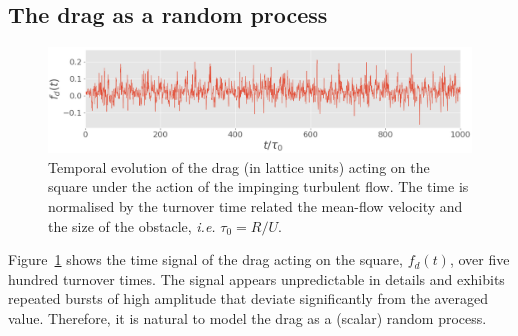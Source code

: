 \documentclass[pre,aps,floatfix,10pt,superscriptaddress, notitlepage,preprint]{revtex4-1}
\begin{document}
\subsection{The drag as a random process
}
\label{sec:pdfs}

\begin{figure}
  \centering
  \includegraphics[width=0.7\linewidth]{typical_drag_signal/typical_drag_signal.png}
  \caption{Temporal evolution of the drag (in lattice units) acting on the square under the action of the impinging turbulent flow. The time is normalised by the turnover time related the mean-flow velocity and the size of the obstacle, \emph{i.e.} $\tau_0=R/U$.}
  \label{fig:typical_drag_signal}
\end{figure}



%
Figure~\ref{fig:typical_drag_signal} shows the time signal of the drag acting on the square, $f_d(t)$, over five hundred turnover times.
The signal appears unpredictable in details and exhibits repeated bursts of high amplitude that deviate significantly from the averaged value.
Therefore, it is natural to model the drag as a (scalar) random process.
\end{document}
